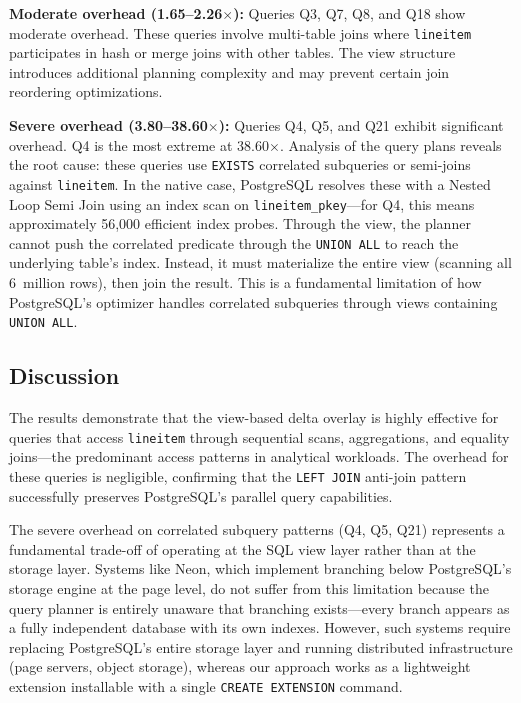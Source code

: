 \documentclass[sigplan, nonacm]{acmart}
\begin{document}
\textbf{Moderate overhead (1.65--2.26$\times$):} Queries Q3, Q7, Q8, and Q18 show moderate overhead. These queries involve multi-table joins where \texttt{lineitem} participates in hash or merge joins with other tables. The view structure introduces additional planning complexity and may prevent certain join reordering optimizations.

\textbf{Severe overhead (3.80--38.60$\times$):} Queries Q4, Q5, and Q21 exhibit significant overhead. Q4 is the most extreme at 38.60$\times$. Analysis of the query plans reveals the root cause: these queries use \texttt{EXISTS} correlated subqueries or semi-joins against \texttt{lineitem}. In the native case, PostgreSQL resolves these with a Nested Loop Semi Join using an index scan on \texttt{lineitem\_pkey}---for Q4, this means approximately 56,000 efficient index probes. Through the view, the planner cannot push the correlated predicate through the \texttt{UNION~ALL} to reach the underlying table's index. Instead, it must materialize the entire view (scanning all 6~million rows), then join the result. This is a fundamental limitation of how PostgreSQL's optimizer handles correlated subqueries through views containing \texttt{UNION~ALL}.

\subsection{Discussion}

The results demonstrate that the view-based delta overlay is highly effective for queries that access \texttt{lineitem} through sequential scans, aggregations, and equality joins---the predominant access patterns in analytical workloads. The overhead for these queries is negligible, confirming that the \texttt{LEFT~JOIN} anti-join pattern successfully preserves PostgreSQL's parallel query capabilities.

The severe overhead on correlated subquery patterns (Q4, Q5, Q21) represents a fundamental trade-off of operating at the SQL view layer rather than at the storage layer. Systems like Neon, which implement branching below PostgreSQL's storage engine at the page level, do not suffer from this limitation because the query planner is entirely unaware that branching exists---every branch appears as a fully independent database with its own indexes. However, such systems require replacing PostgreSQL's entire storage layer and running distributed infrastructure (page servers, object storage), whereas our approach works as a lightweight extension installable with a single \texttt{CREATE~EXTENSION} command.
\end{document}
